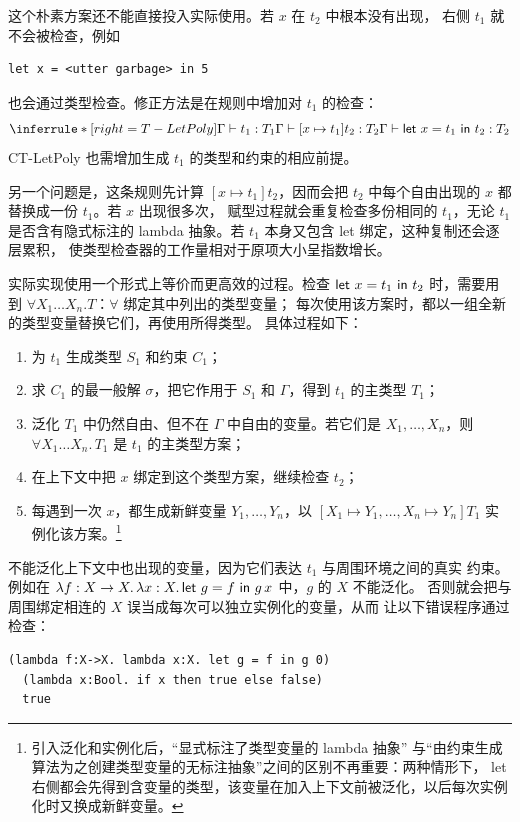 这个朴素方案还不能直接投入实际使用。若 \(x\) 在 \(t_2\) 中根本没有出现，
右侧 \(t_1\) 就不会被检查，例如
\begin{lstlisting}
let x = <utter garbage> in 5
\end{lstlisting}
也会通过类型检查。修正方法是在规则中增加对 \(t_1\) 的检查：
\[
\inferrule*[right=T-LetPoly]
 {\Gamma\vdash t_1:T_1\\
  \Gamma\vdash[x\mapsto t_1]t_2:T_2}
 {\Gamma\vdash\taplterm{let}\ x=t_1\ \taplterm{in}\ t_2:T_2}
\]
CT-LetPoly 也需增加生成 \(t_1\) 的类型和约束的相应前提。

另一个问题是，这条规则先计算 \([x\mapsto t_1]t_2\)，因而会把 \(t_2\)
中每个自由出现的 \(x\) 都替换成一份 \(t_1\)。若 \(x\) 出现很多次，
赋型过程就会重复检查多份相同的 \(t_1\)，无论 \(t_1\) 是否含有隐式标注的
lambda 抽象。若 \(t_1\) 本身又包含 let 绑定，这种复制还会逐层累积，
使类型检查器的工作量相对于原项大小呈指数增长。

实际实现使用一个形式上等价而更高效的过程。检查
\(\mathsf{let}\ x=t_1\ \mathsf{in}\ t_2\) 时，需要用到
\(\forall X_1\ldots X_n.T\)：\(\forall\) 绑定其中列出的类型变量；
每次使用该方案时，都以一组全新的类型变量替换它们，再使用所得类型。
具体过程如下：
\begin{enumerate}
  \item 为 \(t_1\) 生成类型 \(S_1\) 和约束 \(C_1\)；
  \item 求 \(C_1\) 的最一般解 \(\sigma\)，把它作用于 \(S_1\) 和
        \(\Gamma\)，得到 \(t_1\) 的主类型 \(T_1\)；
  \item 泛化 \(T_1\) 中仍然自由、但不在 \(\Gamma\) 中自由的变量。若它们是
        \(X_1,\ldots,X_n\)，则
        \(\forall X_1\ldots X_n.\,T_1\) 是 \(t_1\) 的主类型方案；
  \item 在上下文中把 \(x\) 绑定到这个类型方案，继续检查 \(t_2\)；
  \item 每遇到一次 \(x\)，都生成新鲜变量 \(Y_1,\ldots,Y_n\)，以
        \([X_1\mapsto Y_1,\ldots,X_n\mapsto Y_n]T_1\) 实例化该方案。\footnote{引入泛化和实例化后，“显式标注了类型变量的 lambda 抽象”
与“由约束生成算法为之创建类型变量的无标注抽象”之间的区别不再重要：两种情形下，
let 右侧都会先得到含变量的类型，该变量在加入上下文前被泛化，以后每次实例化时又换成新鲜变量。}
\end{enumerate}
不能泛化上下文中也出现的变量，因为它们表达 \(t_1\) 与周围环境之间的真实
约束。例如在
\(\lambda f:X\to X.\,\lambda x:X.\,
\mathsf{let}\ g=f\ \mathsf{in}\ g\,x\) 中，\(g\) 的 \(X\) 不能泛化。
否则就会把与周围绑定相连的 \(X\) 误当成每次可以独立实例化的变量，从而
让以下错误程序通过检查：
\begin{lstlisting}
(lambda f:X->X. lambda x:X. let g = f in g 0)
  (lambda x:Bool. if x then true else false)
  true
\end{lstlisting}


